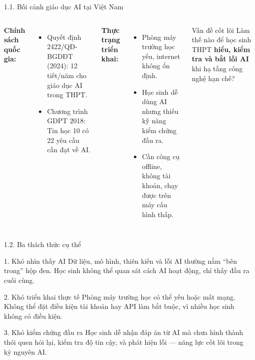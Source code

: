 \documentclass[10pt, aspectratio=169]{beamer}
\begin{document}
\begin{frame}{1.1. Bối cảnh giáo dục AI tại Việt Nam}
    \begin{columns}
        \textbf{Chính sách quốc gia:}
        \begin{itemize}
            \item Quyết định 2422/QĐ-BGDĐT (2024): 12 tiết/năm cho giáo dục AI trong THPT.
            \item Chương trình GDPT 2018: Tin học 10 có 22 yêu cầu cần đạt về AI.
        \end{itemize}
        \vspace{0.5em}
        \textbf{Thực trạng triển khai:}
        \begin{itemize}
            \item Phòng máy trường học yếu, internet không ổn định.
            \item Học sinh dễ dùng AI nhưng thiếu kỹ năng kiểm chứng đầu ra.
            \item Cần công cụ offline, không tài khoản, chạy được trên máy cấu hình thấp.
        \end{itemize}
        \begin{block}{Vấn đề cốt lõi}
            Làm thế nào để học sinh THPT \textbf{hiểu, kiểm tra và bắt lỗi AI} khi hạ tầng công nghệ hạn chế?
        \end{block}
    \end{columns}
\end{frame}

\begin{frame}{1.2. Ba thách thức cụ thể}
    \begin{alertblock}{1. Khó nhìn thấy AI}
        Dữ liệu, mô hình, thiên kiến và lỗi AI thường nằm ``bên trong'' hộp đen. Học sinh không thể quan sát cách AI hoạt động, chỉ thấy đầu ra cuối cùng.
    \end{alertblock}
    
    \vspace{0.3em}
    
    \begin{alertblock}{2. Khó triển khai thực tế}
        Phòng máy trường học có thể yếu hoặc mất mạng. Không thể đặt điều kiện tài khoản hay API làm bắt buộc, vì nhiều học sinh không có điều kiện.
    \end{alertblock}
    
    \vspace{0.3em}
    
    \begin{alertblock}{3. Khó kiểm chứng đầu ra}
        Học sinh dễ nhận đáp án từ AI mà chưa hình thành thói quen hỏi lại, kiểm tra độ tin cậy, và phát hiện lỗi — năng lực cốt lõi trong kỷ nguyên AI.
    \end{alertblock}
\end{frame}
\end{document}
